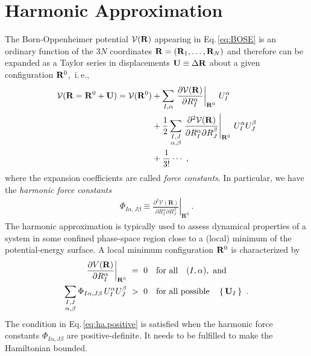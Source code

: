 \section{Harmonic Approximation}
The Born-Oppenheimer potential $\mathcal V ({\bf R})$ appearing in Eq.\,\eqref{eq:BOSE} is an ordinary function of the $3 N$ coordinates ${\bf R} = ({\bf R}_1, \ldots, {\bf R}_{N})$ and therefore can be expanded as a Taylor series in displacements ${\bf U} \equiv \Delta {\bf R}$ about a given configuration ${\bf R}^0$,~i.\,e.,
\begin{align}
\begin{split}
  \mathcal V ({\bf R} = {\bf R}^0 + {\bf U})
    = \mathcal V ({\bf R}^0)
    &+ \sum_{I, \alpha} 
      \left. \frac{\partial \mathcal V({\bf R})}{\partial R^\alpha_I} 
      \right\vert_{{\bf R}^0}
    \,U^\alpha_I
    \\
    &
    + \frac{1}{2}
    \sum_{\substack{I, J \\ \alpha, \beta}}
    \left.\frac{\partial^{2} \mathcal{V}(\mathbf{R})}{\partial R_{I}^{\alpha} \partial R_{J}^{\beta}}\right|_{\mathbf{R}^{0}}
    \, U_I^\alpha U_J^\beta
    \\
    &+\frac{1}{3!}\cdots ~,
\end{split}
\end{align}
where the expansion coefficients are called \emph{force constants}. In particular, we have the \emph{harmonic force constants}
\begin{align}
  \Phi_{I \alpha, J \beta}
  \equiv \left.\frac{\partial^{2} \mathcal{V}(\mathbf{R})}{\partial R_{I}^{\alpha} \partial R_{J}^{\beta}}\right|_{\mathbf{R}^{0}}~.
  \label{eq:FC2}
\end{align}
The harmonic approximation is typically used to assess dynamical properties of a system in some confined phase-space region close to a (local) minimum of the potential-energy surface. A local minimum configuration ${\bf R}^0$ is characterized by
\begin{align}
	\left. \frac{\partial V({\bf R})}{\partial R^\alpha_I} 
	\right\vert_{{\bf R}^0} 
		&~=~ 0 \quad\text{for all}\quad (I, \alpha),~\text{and} \\
	\sum_{\substack{I, J \\ \alpha, \beta}}
	\Phi_{I \alpha, J \beta}
	\, U_I^\alpha U_J^\beta
		&~>~ 0 \quad\text{for all possible}\quad \set{{\bf U}_I}~.
	\label{eq:ha.positive}
\end{align}
The condition in Eq.\,\eqref{eq:ha.positive} is satisfied when the harmonic force constants $\Phi_{I \alpha, J \beta}$ are positive-definite. It needs to be fulfilled to make the Hamiltonian bounded.


